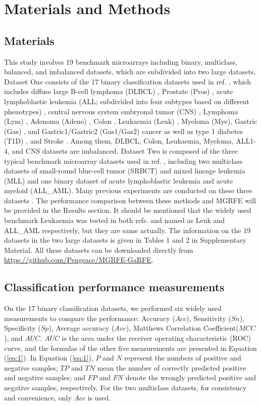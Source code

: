 \documentclass[10pt,journal,compsoc]{IEEEtran}
\begin{document}
	\section{Materials and Methods}
	\subsection{Materials}
	
	This study involves 19 benchmark microarrays including binary, multiclass, balanced, and imbalanced datasets, which are subdivided into two large datasets.
	Dataset One consists of the 17 binary classification datasets used in ref. \cite{W16}, which includes diffuse large B-cell lymphoma (DLBCL) \cite{Y22}, Prostate (Pros) \cite{Y23}, acute lymphoblastic leukemia (ALL; subdivided into four subtypes based on different phenotypes) \cite{Y24}, central nervous system embryonal tumor (CNS) \cite{Y25}, Lymphoma (Lym) \cite{Y26}, Adenoma (Adeno) \cite{Y27}, Colon \cite{Y20}, Leukaemia (Leuk) \cite{Y21}, Myeloma (Mye)\cite{Y28}, Gastric (Gas) \cite{Y29}, and Gastric1/Gastric2 (Gas1/Gas2) cancer \cite{Y30} as well as type 1 diabetes (T1D) \cite{Y31}, and Stroke \cite{Y32}. Among them, DLBCL, Colon, Leukaemia, Myeloma, ALL1-4, and CNS datasets are imbalanced.
	Dataset Two is composed of the three typical benchmark microarray datasets used in ref. \cite{W15}, including two multiclass datasets of small-round blue-cell tumor (SRBCT) \cite{P13} and mixed lineage leukemia (MLL) \cite{W3} and one binary dataset of acute lymphoblastic leukemia and acute myeloid (ALL\_AML). Many previous experiments are conducted on these three datasets \cite{P8,P9,P10,P11,P12,P13,P14,P15,P16,P17,P18,P19,P20,P21,P22,P23}. The performance comparison between these methods and MGRFE will be provided in the Results section. It should be mentioned that the widely used benchmark Leukaemia was tested in both refs. \cite{W16} and \cite{W15} named as Leuk and ALL\_AML respectively, but they are same actually.
	The information on the 19 datasets in the two large datasets is given in Tables 1 and 2 in Supplementary Material. All these datasets can be downloaded directly from \url{https://github.com/Pengeace/MGRFE-GaRFE}.

	
	\subsection{Classification performance measurements}
	
	On the 17 binary classification datasets, we performed six widely used measurements to compare the performance: Accuracy ($Acc$), Sensitivity ($Sn$), Specificity ($Sp$), Average accuracy ($Avc$), Matthews Correlation Coefficient($MCC$), and $AUC$. $AUC$ is the area under the receiver operating characteristic (ROC) curve, and the formulas of the other five measurements are presented in Equation (\ref{eq:1}). In Equation (\ref{eq:1}), $P$ and $N$ represent the numbers of positive and negative samples; $TP$ and $TN$ mean the number of correctly predicted positive and negative samples; and $FP$ and $FN$ denote the wrongly predicted positive and negative samples, respectively. For the two multiclass datasets, for consistency and convenience, only \(Acc\) is used.
	
\end{document}
